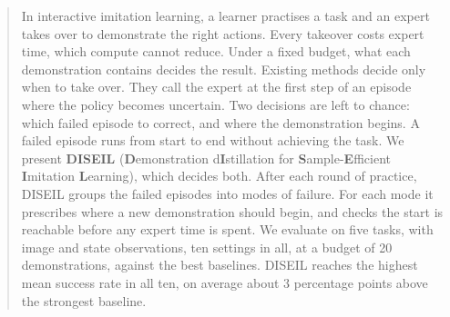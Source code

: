 \begin{abstract}
In interactive imitation learning, a learner practises a task and an expert takes
over to demonstrate the right actions. Every takeover costs expert time, which
compute cannot reduce. Under a fixed budget, what each demonstration contains
decides the result. Existing methods decide only when to take over. They call the
expert at the first step of an episode where the policy becomes uncertain. Two
decisions are left to chance: which failed episode to correct, and where the
demonstration begins. A failed episode runs from start to end without achieving
the task. We present \textbf{DISEIL} (\textbf{D}emonstration d\textbf{I}stillation
for \textbf{S}ample-\textbf{E}fficient \textbf{I}mitation \textbf{L}earning), which
decides both. After each round of practice, DISEIL groups the failed episodes into
modes of failure. For each mode it prescribes where a new demonstration should
begin, and checks the start is reachable before any expert time is spent. We
evaluate on five tasks, with image and state observations, ten settings in all,
at a budget of 20 demonstrations, against the best baselines. DISEIL reaches the
highest mean success rate in all ten, on average about 3 percentage points above
the strongest baseline.
\end{abstract}
